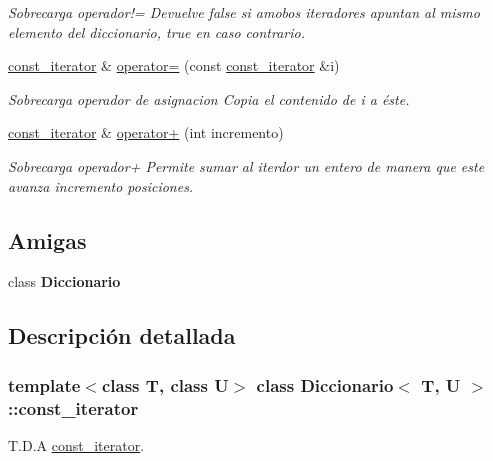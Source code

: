 \begin{DoxyCompactItemize}
\begin{DoxyCompactList}\small\item\em Sobrecarga operador!= Devuelve false si amobos iteradores apuntan al mismo elemento del diccionario, true en caso contrario. \end{DoxyCompactList}\item 
\hyperlink{classDiccionario_1_1const__iterator}{const\+\_\+iterator} \& \hyperlink{classDiccionario_1_1const__iterator_a97cbf774b9b669edef100ef9f42fc8d4}{operator=} (const \hyperlink{classDiccionario_1_1const__iterator}{const\+\_\+iterator} \&i)
\begin{DoxyCompactList}\small\item\em Sobrecarga operador de asignacion Copia el contenido de i a éste. \end{DoxyCompactList}\item 
\hyperlink{classDiccionario_1_1const__iterator}{const\+\_\+iterator} \& \hyperlink{classDiccionario_1_1const__iterator_a080e1da79c76b17480b3ff8ed298ae89}{operator+} (int incremento)
\begin{DoxyCompactList}\small\item\em Sobrecarga operador+ Permite sumar al iterdor un entero de manera que este avanza incremento posiciones. \end{DoxyCompactList}\end{DoxyCompactItemize}
\subsection*{Amigas}
\begin{DoxyCompactItemize}
\item 
\mbox{\label{classDiccionario_1_1const__iterator_ad36be158dde0129b4e0d03d0e454a26b}} 
class {\bfseries Diccionario}
\end{DoxyCompactItemize}


\subsection{Descripción detallada}
\subsubsection*{template$<$class T, class U$>$\newline
class Diccionario$<$ T, U $>$\+::const\+\_\+iterator}

T.\+D.\+A \hyperlink{classDiccionario_1_1const__iterator}{const\+\_\+iterator}. 

